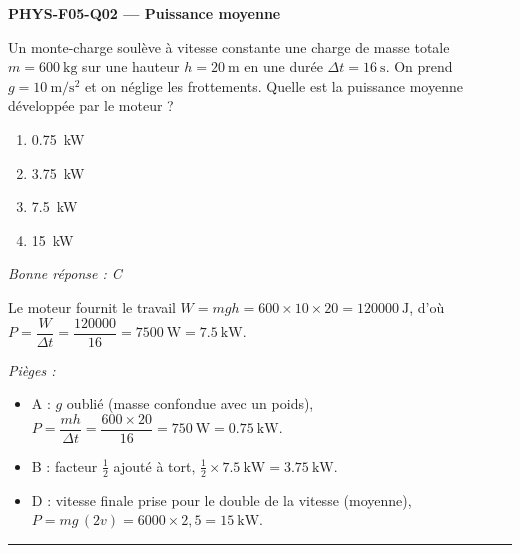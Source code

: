 \documentclass[11pt,a4paper]{article}
\begin{document}
\noindent\textbf{PHYS-F05-Q02 --- Puissance moyenne}\par
Un monte-charge soulève à vitesse constante une charge de masse totale $m=\qty{600}{\kilogram}$
sur une hauteur $h=\qty{20}{\metre}$ en une durée $\Delta t=\qty{16}{\second}$. On prend
$g=\qty{10}{\metre\per\second\squared}$ et on néglige les frottements. Quelle est la puissance
moyenne développée par le moteur ?
\begin{enumerate}[label=\Alph*)]
\item \qty{0.75}{\kilo\watt}
\item \qty{3.75}{\kilo\watt}
\item \qty{7.5}{\kilo\watt}
\item \qty{15}{\kilo\watt}
\end{enumerate}
\textit{Bonne réponse : C}\par
Le moteur fournit le travail $W=mgh=600\times10\times20=\qty{120000}{\joule}$, d'où
$P=\dfrac{W}{\Delta t}=\dfrac{120000}{16}=\qty{7500}{\watt}=\qty{7.5}{\kilo\watt}$.\par
\textit{Pièges :}
\begin{itemize}
\item A : $g$ oublié (masse confondue avec un poids), $P=\dfrac{mh}{\Delta t}=\dfrac{600\times20}{16}=\qty{750}{\watt}=\qty{0.75}{\kilo\watt}$.
\item B : facteur $\tfrac12$ ajouté à tort, $\tfrac12\times\qty{7.5}{\kilo\watt}=\qty{3.75}{\kilo\watt}$.
\item D : vitesse finale prise pour le double de la vitesse (moyenne), $P=mg\,(2v)=6000\times2{,}5=\qty{15}{\kilo\watt}$.
\end{itemize}
\vspace{8pt}\hrule\vspace{8pt}
\end{document}
